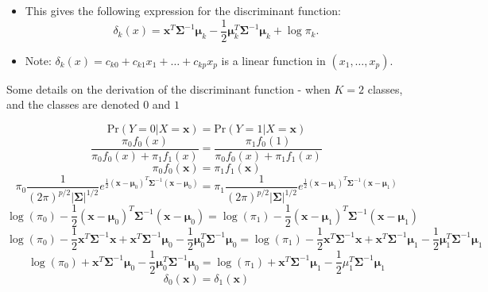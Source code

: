 \documentclass[10pt,ignorenonframetext,]{beamer}
\begin{document}
\begin{frame}

\begin{itemize}
\item
  This gives the following expression for the discriminant function:
  \[\delta_k(x) = {\boldsymbol x}^T \boldsymbol{\Sigma}^{-1}\boldsymbol\mu_k - \frac{1}{2}\boldsymbol\mu_k^T \boldsymbol{\Sigma}^{-1}\boldsymbol\mu_k + \log \pi_k.\]
\item
  Note: \(\delta_k(x) = c_{k0} + c_{k1}x_1 + \ldots + c_{kp}x_p\) is a
  linear function in \((x_1,\ldots ,x_p)\).
\end{itemize}

\end{frame}

\begin{frame}

Some details on the derivation of the discriminant function - when
\(K=2\) classes, and the classes are denoted \(0\) and \(1\)

\[\text{Pr}(Y=0 | X={\boldsymbol x}) = \text{Pr}(Y=1 | X={\boldsymbol x})\]
\[\frac{\pi_0f_0(x)}{\pi_0f_0(x)+\pi_1f_1(x)} = \frac{\pi_1f_0(1)}{\pi_0f_0(x)+\pi_1f_1(x)} \]
\[\pi_0 f_0({\boldsymbol x}) = \pi_1 f_1({\boldsymbol x})\]
\[\pi_0\frac{1}{(2 \pi)^{p/2}|\boldsymbol{\Sigma}|^{1/2}}
e^{\frac{1}{2}({\boldsymbol x}-\boldsymbol{\mu}_0)^T \boldsymbol{\Sigma}^{-1}({\boldsymbol x}-\boldsymbol{\mu}_0)} =  \pi_1\frac{1}{(2 \pi)^{p/2}|\boldsymbol{\Sigma}|^{1/2}}e^{\frac{1}{2}({\boldsymbol x}-\boldsymbol{\mu}_1)^T \boldsymbol{\Sigma}^{-1}({\boldsymbol x}-\boldsymbol{\mu}_1)} \]
\[\log(\pi_0) -\frac{1}{2}({\boldsymbol x}-\boldsymbol{\mu}_0)^T \boldsymbol{\Sigma}^{-1}({\boldsymbol x}-\boldsymbol{\mu}_0) = 
\log(\pi_1) -\frac{1}{2}({\boldsymbol x}-\boldsymbol{\mu}_1)^T \boldsymbol{\Sigma}^{-1}({\boldsymbol x}-\boldsymbol{\mu}_1) \]
\[\log(\pi_0)  -\frac{1}{2}{\boldsymbol x}^T\boldsymbol{\Sigma}^{-1}{\boldsymbol x} + {\boldsymbol x}^T\boldsymbol{\Sigma}^{-1}\boldsymbol{\mu}_0 - \frac{1}{2}\boldsymbol{\mu}_0^T\boldsymbol{\Sigma}^{-1}\boldsymbol{\mu}_0 = \log(\pi_1)  -\frac{1}{2}{\boldsymbol x}^T\boldsymbol{\Sigma}^{-1}{\boldsymbol x} + {\boldsymbol x}^T\boldsymbol{\Sigma}^{-1}\boldsymbol{\mu}_1 - \frac{1}{2}\boldsymbol{\mu}_1^T\boldsymbol{\Sigma}^{-1}\boldsymbol{\mu}_1 \]
\[\log(\pi_0) + {\boldsymbol x}^T\boldsymbol{\Sigma}^{-1}\boldsymbol{\mu}_0 - \frac{1}{2}\boldsymbol{\mu}_0^T\boldsymbol{\Sigma}^{-1}\boldsymbol{\mu}_0 = 
\log(\pi_1) + {\boldsymbol x}^T\boldsymbol{\Sigma}^{-1}\boldsymbol{\mu}_1 - \frac{1}{2}\mu_1^T\boldsymbol{\Sigma}^{-1}\boldsymbol{\mu}_1\]
\[\delta_0({\boldsymbol x}) = \delta_1({\boldsymbol x}) \]

\end{frame}
\end{document}
